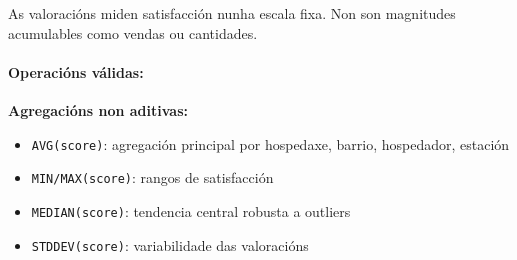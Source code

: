 \documentclass[12pt,a4paper]{article}
\begin{document}
As valoracións miden satisfacción nunha escala fixa. Non son magnitudes acumulables como vendas ou cantidades.

\paragraph{Operacións válidas:}

\textbf{Agregacións non aditivas:}
\begin{itemize}
	\item \texttt{AVG(score)}: agregación principal por hospedaxe, barrio, hospedador, estación
	\item \texttt{MIN/MAX(score)}: rangos de satisfacción
	\item \texttt{MEDIAN(score)}: tendencia central robusta a outliers
	\item \texttt{STDDEV(score)}: variabilidade das valoracións
\end{itemize}

\newpage



\end{document}
